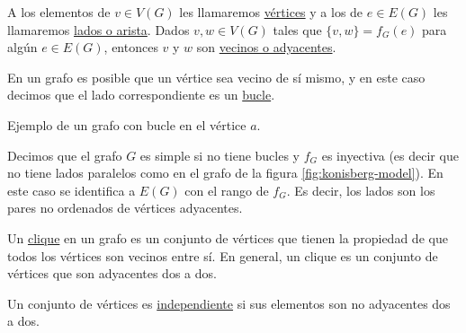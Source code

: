 \begin{defn}[Vocabulario]
    A los elementos de $v \in V(G)$ les llamaremos \ul{vértices} y a los de $e \in E(G)$ les llamaremos \ul{lados o arista}. Dados $v, w \in V(G)$ tales que $\{v, w\} = f_G(e)$ para algún $e \in E(G)$, entonces $v$ y $w$ son \ul{vecinos o adyacentes}.
    
    En un grafo es posible que un vértice sea vecino de sí mismo, y en este caso decimos que el lado correspondiente es un \ul{bucle}.
    
    \begin{marginfigure}
        \centering
        \caption{Ejemplo de un grafo con bucle en el vértice $a$.}
    \end{marginfigure}
    
    Decimos que el grafo $G$ es simple si no tiene bucles y $f_G$ es inyectiva (es decir que no tiene lados paralelos como en el grafo de la figura \ref{fig:konisberg-model}). En este caso se identifica a $E(G)$ con el rango de $f_G$. Es decir, los lados son los pares no ordenados de vértices adyacentes.
\end{defn}

\begin{defn}
    Un \ul{clique} en un grafo es un conjunto de vértices que tienen la propiedad de que todos los vértices son vecinos entre sí. En general, un clique es un conjunto de vértices que son adyacentes dos a dos.
    
    Un conjunto de vértices es \ul{independiente} si sus elementos son no adyacentes dos a dos.
\end{defn}

